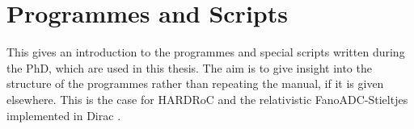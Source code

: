 \chapter{Programmes and Scripts}

This gives an introduction to the programmes and special scripts
written during the PhD, which are used in this thesis. The aim is
to give insight into the structure of the programmes rather than repeating
the manual, if it is given elsewhere. This is the case for HARDRoC
\cite{HARDRoC} and the relativistic FanoADC-Stieltjes implemented in Dirac
\cite{DIRAC13}.





